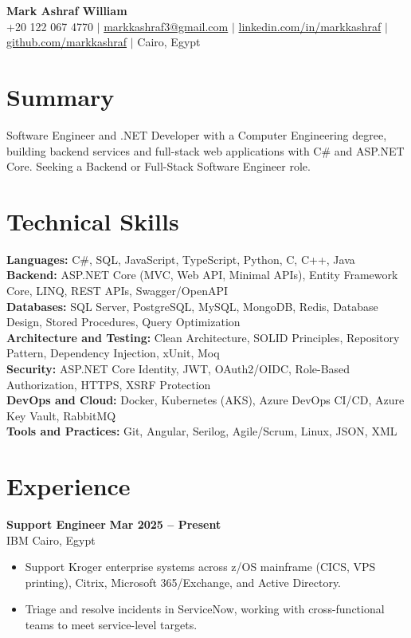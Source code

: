 \documentclass[letterpaper,11pt]{article}
\begin{document}
\begin{center}
    {\LARGE\bfseries Mark Ashraf William}\\[3pt]
    \small
    +20 122 067 4770 $\vert$
    \href{mailto:markkashraf3@gmail.com}{markkashraf3@gmail.com} $\vert$
    \href{https://linkedin.com/in/markkashraf}{linkedin.com/in/markkashraf} $\vert$
    \href{https://github.com/markkashraf}{github.com/markkashraf} $\vert$
    Cairo, Egypt
\end{center}

\section{Summary}
Software Engineer and .NET Developer with a Computer Engineering degree, building backend services and
full-stack web applications with C\# and ASP.NET Core. Seeking a Backend or Full-Stack Software Engineer role.

\section{Technical Skills}
\textbf{Languages:} C\#, SQL, JavaScript, TypeScript, Python, C, C++, Java\\
\textbf{Backend:} ASP.NET Core (MVC, Web API, Minimal APIs), Entity Framework Core, LINQ, REST APIs, Swagger/OpenAPI\\
\textbf{Databases:} SQL Server, PostgreSQL, MySQL, MongoDB, Redis, Database Design, Stored Procedures, Query Optimization\\
\textbf{Architecture and Testing:} Clean Architecture, SOLID Principles, Repository Pattern, Dependency Injection, xUnit, Moq\\
\textbf{Security:} ASP.NET Core Identity, JWT, OAuth2/OIDC, Role-Based Authorization, HTTPS, XSRF Protection\\
\textbf{DevOps and Cloud:} Docker, Kubernetes (AKS), Azure DevOps CI/CD, Azure Key Vault, RabbitMQ\\
\textbf{Tools and Practices:} Git, Angular, Serilog, Agile/Scrum, Linux, JSON, XML

\section{Experience}
\textbf{Support Engineer} \hfill \textbf{Mar 2025 -- Present}\\
IBM \hfill Cairo, Egypt
\begin{itemize}
  \item Support Kroger enterprise systems across z/OS mainframe (CICS, VPS printing), Citrix, Microsoft 365/Exchange, and Active Directory.
  \item Triage and resolve incidents in ServiceNow, working with cross-functional teams to meet service-level targets.
\end{itemize}
\end{document}
